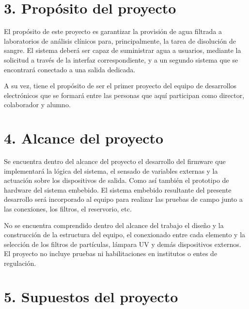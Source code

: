 \documentclass[
11pt, %
]{charter}
\begin{document}
\section{3. Propósito del proyecto}
\label{sec:proposito}

El propósito de este proyecto es garantizar la provisión de agua filtrada a laboratorios de análisis clínicos para, principalmente, la tarea de disolución de sangre. El sistema deberá ser capaz de suministrar agua a usuarios, mediante la solicitud a través de la interfaz correspondiente, y a un segundo sistema que se encontrará conectado a una salida dedicada.

A su vez, tiene el propósito de ser el primer proyecto del equipo de desarrollos electrónicos que se formará entre las personas que aquí participan como director, colaborador y alumno.

\section{4. Alcance del proyecto}
\label{sec:alcance}

Se encuentra dentro del alcance del proyecto el desarrollo del firmware que implementará la lógica del sistema, el sensado de variables externas y la actuación sobre los dispositivos de salida. Como así también el prototipo de hardware del sistema embebido. 
El sistema embebido resultante del presente desarrollo será incorporado al equipo para realizar las pruebas de campo junto a las conexiones, los filtros, el reservorio, etc.

No se encuentra comprendido dentro del alcance del trabajo el diseño y la construcción de la estructura del equipo, el conexionado entre cada elemento y la selección de los filtros de partículas, lámpara UV y demás dispositivos externos.
El proyecto no incluye pruebas ni habilitaciones en institutos o entes de regulación.


\section{5. Supuestos del proyecto}
\label{sec:supuestos}
\end{document}
